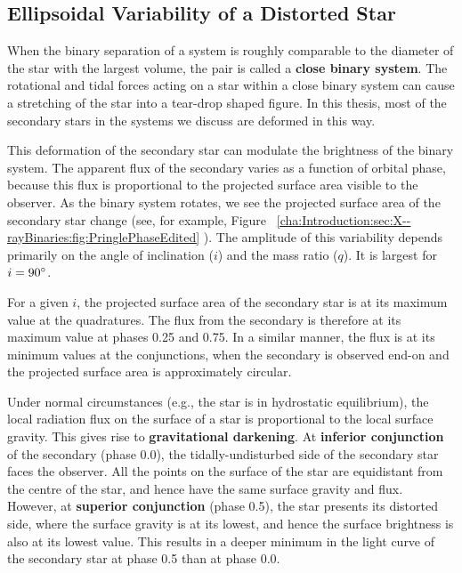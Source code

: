 
\subsection{Ellipsoidal Variability of a Distorted Star}
\label{cha:Introduction:sec:X--rayBinaries:subsec:EllipsoidalVariability}

When the binary separation of a system is roughly comparable to the
diameter of the star with the largest volume, the pair is called a
\textbf{close binary system}. %
The rotational and tidal forces acting on a star within a close binary
system can cause a stretching of the star into a tear-drop shaped
figure. In this thesis, most of the secondary stars in the systems we discuss are deformed in this way. %

\vspace{\myparskip}

This deformation of the secondary star can modulate the brightness of the binary system. %
The apparent flux of the secondary varies as a function of orbital phase, because this flux is
proportional to the projected surface area %
visible to the observer. As the binary system rotates, we see the projected surface area of the secondary star change (see, for example, Figure~%
\vref{cha:Introduction:sec:X--rayBinaries:fig:PringlePhaseEdited}%
). The amplitude of this variability depends primarily on the angle of inclination ($i$) and the mass ratio ($q$). It is largest for $i=90\hbox{$^\circ$}$. %

\vspace{\myparskip}

For a given $i$, the projected surface area of the secondary star is
at its maximum value at the quadratures. The flux from the secondary is therefore at
its maximum value at phases 0.25 and 0.75. In a similar manner, the
flux is at its minimum values at the conjunctions, when the secondary is observed end-on and the
projected surface area is approximately circular. %

\vspace{\myparskip}

Under normal circumstances (e.g., the star is in hydrostatic
equilibrium), the local radiation flux on the surface of a star is
proportional to the local surface gravity. %
This gives rise to \textbf{gravitational darkening}. %
At \textbf{inferior conjunction} of the secondary (phase 0.0), the tidally-undisturbed side of the
secondary star faces the observer. All the points on the surface of
the star are equidistant from the centre of the star, and hence have the
same surface gravity and flux. %
However, at \textbf{superior conjunction} (phase 0.5), the star presents its distorted side, where the surface gravity is at its lowest, and hence the surface brightness
is also at its lowest value. This results in a deeper minimum in the light curve of the secondary star at phase 0.5 than at phase 0.0.

